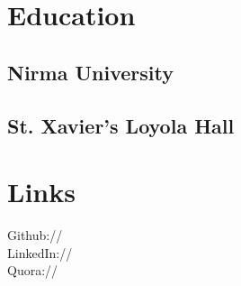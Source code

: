 \documentclass[]{deedy-resume-openfont}
\begin{document}
%
%
\lastupdated

%
%



%
%

\begin{minipage}[t]{0.33\textwidth} 


\section{Education} 

\subsection{Nirma University}
\sectionsep


\sectionsep

\subsection{St. Xavier's Loyola Hall}
\sectionsep


\section{Links} 
Github:// \href{https://github.com/Shivamshaiv}{} \\
LinkedIn://  \href{https://www.linkedin.com/in/shivam-p-8b7b3585/}{} \\
Quora://  \href{https://www.quora.com//Shivam-Patel-32}{}
\sectionsep


\end{minipage}
\end{document}
